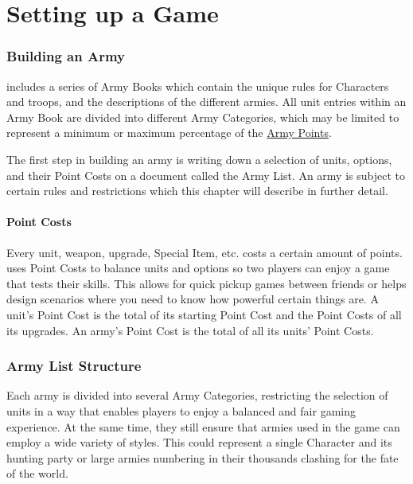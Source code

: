
\part{Setting up a Game}
\label{setting_up_a_game}

\section{Building an Army}
\label{building_an_army}

\nameofthegame{} includes a series of Army Books which contain the unique rules for Characters and troops, and the descriptions of the different armies. All unit entries within an Army Book are divided into different Army Categories, which may be limited to represent a minimum or maximum percentage of the \hyperref[army_points]{Army Points}.

The first step in building an army is writing down a selection of units, options, and their Point Costs on a document called the Army List. An army is subject to certain rules and restrictions which this chapter will describe in further detail.

\subsection{Point Costs}
\label{point_costs}

Every unit, weapon, upgrade, Special Item, etc. costs a certain amount of points. \theninthage{} uses Point Costs to balance units and options so two players can enjoy a game that tests their skills. This allows for quick pickup games between friends or helps design scenarios where you need to know how powerful certain things are. A unit's Point Cost is the total of its starting Point Cost and the Point Costs of all its upgrades. An army's Point Cost is the total of all its units' Point Costs.

\section{Army List Structure}
\label{army_list_structure}

Each army is divided into several Army Categories, restricting the selection of units in a way that enables players to enjoy a balanced and fair gaming experience. At the same time, they still ensure that armies used in the game can employ a wide variety of styles. This could represent a single Character and its hunting party or large armies numbering in their thousands clashing for the fate of the world.

